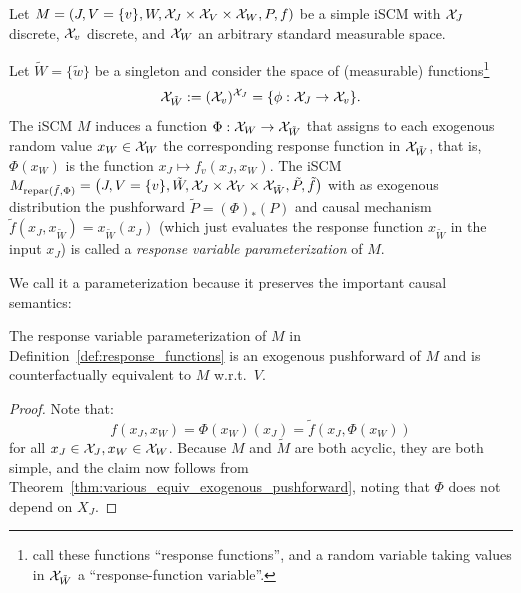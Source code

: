 \begin{Def}\label{def:response_functions}
  Let $M = \left ( J, V=\{v\}, W, \mathcal{X}_J \times \mathcal{X}_V \times \mathcal{X}_W, P, f \right )$ be a simple iSCM
  with $\mathcal{X}_J$ discrete, $\mathcal{X}_v$ discrete, and $\mathcal{X}_W$ an arbitrary standard measurable space.
  
  Let $\tilde{W} = \{\tilde{w}\}$ be a singleton and consider the space of (measurable) functions\footnote{\cite{BalkePearl1994b} call these functions ``response functions'', and a random variable taking values in $\mathcal{X}_{\tilde{W}}$ a ``response-function variable''.}
  $$\mathcal{X}_{\tilde{W}} := (\mathcal{X}_v)^{\mathcal{X}_J} = \{\phi : \mathcal{X}_J \to \mathcal{X}_v\}.$$
  The iSCM $M$ induces a function $\Phi : \mathcal{X}_W \to \mathcal{X}_{\tilde{W}}$ that assigns to each exogenous random value $x_W \in \mathcal{X}_W$ the corresponding response function in $\mathcal{X}_{\tilde{W}}$, that is, $\Phi(x_W)$ is the function $x_J \mapsto f_v(x_J, x_W)$.
  The iSCM $M_{\mathrm{repar}({\tilde{f}},{\Phi})} = \left ( J, V=\{v\}, \tilde{W}, \mathcal{X}_J \times \mathcal{X}_V \times \mathcal{X}_{\tilde{W}}, \tilde{P}, \tilde{f} \right )$
  with as exogenous distribution the pushforward $\tilde{P} = (\Phi)_* (P)$ and
  causal mechanism $\tilde{f}(x_J,x_{\tilde{W}}) = x_{\tilde{W}}(x_J)$ (which just evaluates the response function $x_{\tilde{W}}$ in the input $x_J$) is called a \emph{response variable parameterization} of $M$.
\end{Def}
We call it a parameterization because it preserves the important causal semantics:
\begin{Prp}\label{prp:counterfactual_equivalence_response_functions}
  The response variable parameterization of $M$ in Definition~\ref{def:response_functions} is an exogenous pushforward of $M$ and is
  counterfactually equivalent to $M$ w.r.t.\ $V$.
\end{Prp}
\begin{proof}
  Note that:
    $$f(x_J,x_W) = \Phi(x_W)(x_J) = \tilde{f}(x_J,\Phi(x_W))$$
  for all $x_J \in \mathcal{X}_J, x_W \in \mathcal{X}_W$.
  Because $M$ and $\tilde{M}$ are both acyclic, they are both simple, and the claim now follows from Theorem~\ref{thm:various_equiv_exogenous_pushforward}, noting that $\Phi$ does not depend on $X_J$.
\end{proof}

